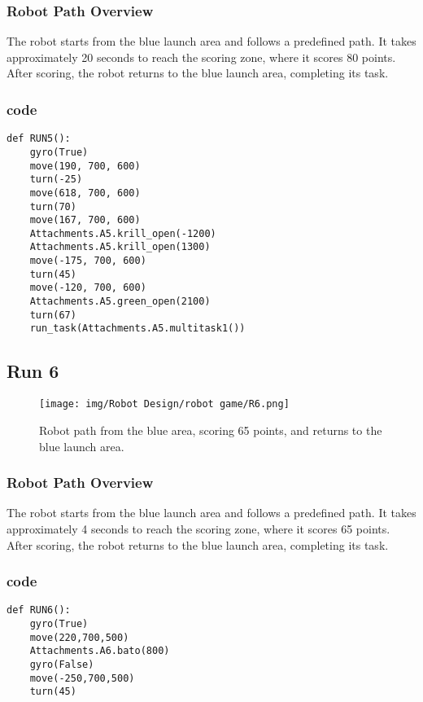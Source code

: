 \subsubsection{Robot Path Overview}

The robot starts from the blue launch area and follows a predefined path. It takes approximately 20 seconds to reach the scoring zone, where it scores 80 points. After scoring, the robot returns to the blue launch area, completing its task.
\subsubsection{code}
\begin{lstlisting}
def RUN5():
    gyro(True)
    move(190, 700, 600)
    turn(-25)
    move(618, 700, 600)
    turn(70)
    move(167, 700, 600)
    Attachments.A5.krill_open(-1200)
    Attachments.A5.krill_open(1300)
    move(-175, 700, 600)
    turn(45)
    move(-120, 700, 600)
    Attachments.A5.green_open(2100)
    turn(67)
    run_task(Attachments.A5.multitask1())
\end{lstlisting}






\newpage
\subsection{Run 6}
\begin{figure}[h]
    \centering
    \texttt{[image: img/Robot Design/robot game/R6.png]}
    \caption{Robot path from the blue area, scoring 65 points, and returns to the blue launch area.}
    \label{fig:robot_path}
\end{figure}
\subsubsection{Robot Path Overview}

The robot starts from the blue launch area and follows a predefined path. It takes approximately 4 seconds to reach the scoring zone, where it scores 65 points. After scoring, the robot returns to the blue launch area, completing its task.
\subsubsection{code}
\begin{lstlisting}
def RUN6():
    gyro(True)
    move(220,700,500)
    Attachments.A6.bato(800)
    gyro(False)
    move(-250,700,500)
    turn(45)
\end{lstlisting}






